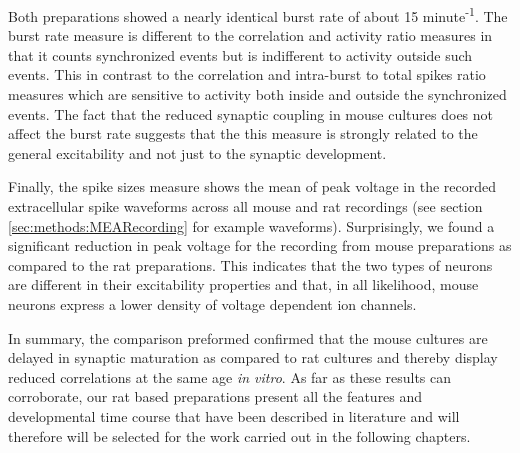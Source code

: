     Both preparations showed a nearly identical burst rate of about 15 minute\textsuperscript{-1}. The burst rate measure is different to the correlation and activity ratio measures in that it counts synchronized events but is indifferent to activity outside such events. This in contrast to the correlation and intra-burst to total spikes ratio measures which are sensitive to activity both inside and outside the synchronized events. The fact that the reduced synaptic coupling in mouse cultures does not affect the burst rate suggests that the this measure is strongly related to the general excitability and not just to the synaptic development.

    Finally, the spike sizes measure shows the mean of peak voltage in the recorded extracellular spike waveforms across all mouse and rat recordings (see section \ref{sec:methods:MEARecording} for example waveforms). Surprisingly, we found a significant reduction in peak voltage for the recording from mouse preparations as compared to the rat preparations. This indicates that the two types of neurons are different in their excitability properties and that, in all likelihood, mouse neurons express a lower density of voltage dependent ion channels.

    In summary, the comparison preformed confirmed that the mouse cultures are delayed in synaptic maturation as compared to rat cultures and thereby display reduced correlations at the same age \textit{in vitro}. As far as these results can corroborate, our rat based preparations present all the features and developmental time course that have been described in literature and will therefore will be selected for the work carried out in the following chapters.


